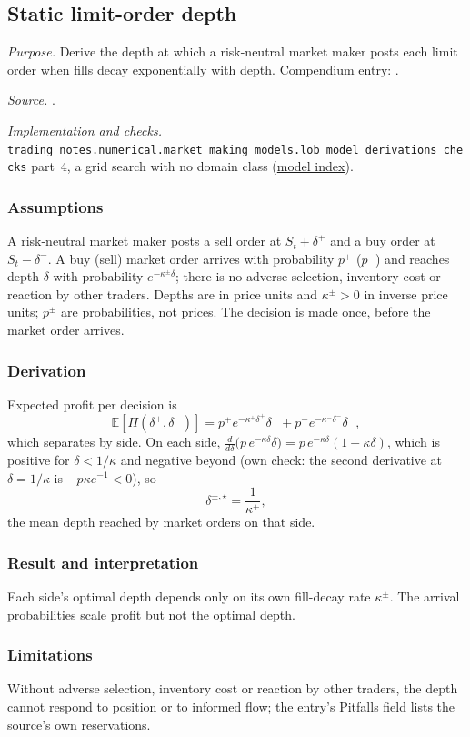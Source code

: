 \subsection{Static limit-order depth}\label{drv:static-limit-order-depth}

\emph{Purpose.} Derive the depth at which a risk-neutral market maker posts each limit order when fills decay exponentially with depth. Compendium entry: .

\emph{Source.} \citep[chap.~``A Primer on the Microstructure of Financial Markets'', pp.~28--30, eq.~(2.3)]{crypto-cartea}.

\emph{Implementation and checks.} \nolinkurl{trading_notes.numerical.market_making_models.lob_model_derivations_checks} part~4, a grid search with no domain class (\hyperref[drv:model-index]{model index}).

\subsubsection{Assumptions}
A risk-neutral market maker posts a sell order at $S_t+\delta^+$ and a buy order at $S_t-\delta^-$. A buy (sell) market order arrives with probability $p^+$ ($p^-$) and reaches depth $\delta$ with probability $e^{-\kappa^\pm\delta}$; there is no adverse selection, inventory cost or reaction by other traders. Depths are in price units and $\kappa^\pm>0$ in inverse price units; $p^\pm$ are probabilities, not prices. The decision is made once, before the market order arrives.

\subsubsection{Derivation}
Expected profit per decision is
\[ \mathbb{E}[\Pi(\delta^+,\delta^-)]=p^+e^{-\kappa^+\delta^+}\delta^+ + p^-e^{-\kappa^-\delta^-}\delta^-, \]
which separates by side. On each side, $\frac{d}{d\delta}\big(p\,e^{-\kappa\delta}\delta\big)=p\,e^{-\kappa\delta}(1-\kappa\delta)$, which is positive for $\delta<1/\kappa$ and negative beyond (own check: the second derivative at $\delta=1/\kappa$ is $-p\kappa e^{-1}<0$), so
\[ \delta^{\pm,\star}=\frac{1}{\kappa^\pm}, \]
the mean depth reached by market orders on that side.

\subsubsection{Result and interpretation}
Each side's optimal depth depends only on its own fill-decay rate $\kappa^\pm$. The arrival probabilities scale profit but not the optimal depth.

\subsubsection{Limitations}
Without adverse selection, inventory cost or reaction by other traders, the depth cannot respond to position or to informed flow; the entry's Pitfalls field lists the source's own reservations.
